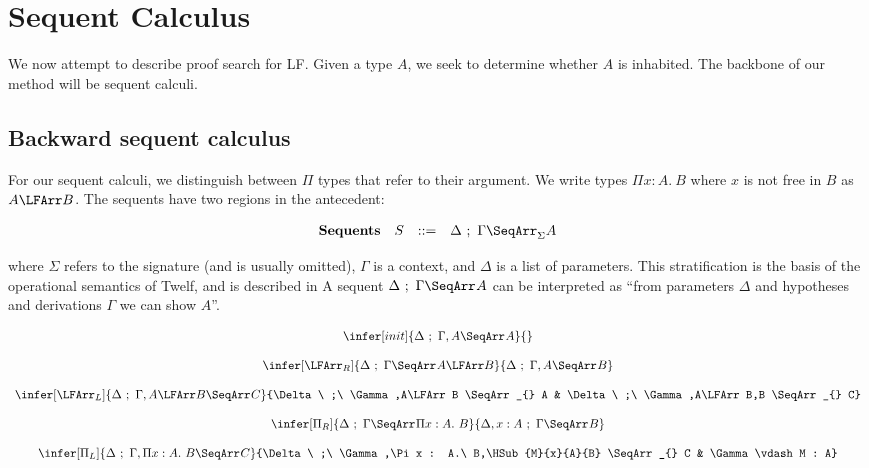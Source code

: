 


\section{Sequent Calculus}

We now attempt to describe proof search for LF.
Given a type $A$, we seek to determine whether $A$ 
is inhabited. The backbone of our method will be sequent calculi.

\renewcommand{\PiTyp}[3]{\Pi #1 : #2.\ #3}
\renewcommand{\Lam}[2]{\lambda #1.\ #2}


\subsection{Backward sequent calculus}
For our sequent calculi, we distinguish between $\Pi$ types
that refer to their argument.  We write types 
$\PiTyp{x}{A}{B}$ where $x$ is not free in $B$ as
$A \LFArr B$.  The sequents have two regions in the antecedent:

\newcommand{\Sequent}[4][]{#2\ ;\ #3 \SeqArr_{#1} #4}

$$
\begin{array}{llll}
\mathbf{Sequents} & S & ::= & \Sequent[\Sigma]{\Delta}{\Gamma}{A} \\
\end{array} 
$$

\noindent 
where $\Sigma$ refers to the signature (and is usually omitted),
$\Gamma$ is a context, and $\Delta$ is a list of parameters.   
This stratification is the basis of the operational semantics
of Twelf, and is described in 
A sequent $\Sequent{\Delta}{\Gamma}{A}$
can be interpreted as ``from parameters $\Delta$ and hypotheses 
and derivations $\Gamma$ we can show $A$''.  

$$
\begin{array}{c}
\infer[init]{\Sequent{\Delta}{\Gamma,A}{A}}{} \\\\
\infer[\LFArr_R]{\Sequent{\Delta}{\Gamma}{A\LFArr B}}
                {\Sequent{\Delta}{\Gamma,A}{B}} \\\\
\infer[\LFArr_L]{\Sequent{\Delta}{\Gamma,A\LFArr B}{C}}
                {\Sequent{\Delta}{\Gamma,A\LFArr B}{A} & 
                 \Sequent{\Delta}{\Gamma,A\LFArr B,B}{C}}\\\\
\infer[\Pi_R]{\Sequent{\Delta}{\Gamma}{\PiTyp{x}{A}{B}}}
             {\Sequent{\Delta,x:A}{\Gamma}{B}} \\\\
\infer[\Pi_L]{\Sequent{\Delta}{\Gamma,\PiTyp{x}{A}{B}}{C}}
             {\Sequent{\Delta}{\Gamma,\PiTyp{x}{A}{B},\HSub{M}{x}{A}{B}}{C} & 
              \Gamma \vdash M : A}
\end{array} 
$$

